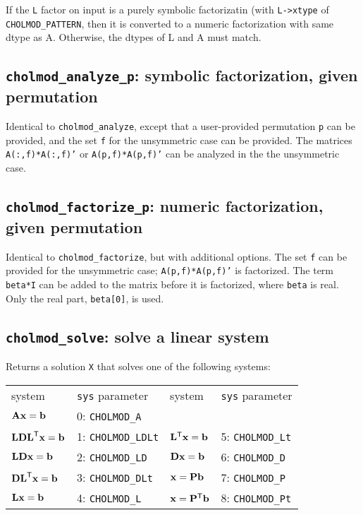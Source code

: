 \documentclass[11pt]{article}
\newcommand{\m}[1]{{\bf{#1}}}       %
\newcommand{\tr}{^{\sf T}}          %
\begin{document}
If the \verb'L' factor on input is a purely symbolic factorizatin (with
\verb'L->xtype' of \verb'CHOLMOD_PATTERN', then it is converted to a numeric
factorization with same dtype as A.  Otherwise, the dtypes of L and A must
match.

\subsection{{\tt cholmod\_analyze\_p}: symbolic factorization, given
permutation}


Identical to {\tt cholmod\_analyze}, except that a user-provided permutation
{\tt p} can be provided, and the set {\tt f} for the unsymmetric case can be
provided.  The matrices {\tt A(:,f)*A(:,f)'} or {\tt A(p,f)*A(p,f)'} can be
analyzed in the the unsymmetric case.

\subsection{{\tt cholmod\_factorize\_p}: numeric factorization, given
permutation}


Identical to {\tt cholmod\_factorize}, but with additional options.  The set
{\tt f} can be provided for the unsymmetric case; {\tt A(p,f)*A(p,f)'} is
factorized.  The term {\tt beta*I} can be added to the matrix before it is
factorized, where {\tt beta} is real.  Only the real part, {\tt beta[0]}, is
used.

\subsection{{\tt cholmod\_solve}: solve a linear system}


Returns a solution {\tt X} that solves one of the following systems:

\begin{tabular}{ll|ll}
\hline
system                  & {\tt sys} parameter    & system                & {\tt sys} parameter  \\
$\m{Ax}=\m{b}$          & 0: {\tt CHOLMOD\_A}    &                       &                      \\
$\m{LDL}\tr\m{x}=\m{b}$ & 1: {\tt CHOLMOD\_LDLt} & $\m{L}\tr\m{x}=\m{b}$ & 5: {\tt CHOLMOD\_Lt} \\
$\m{LDx}=\m{b}$         & 2: {\tt CHOLMOD\_LD}   & $\m{Dx}=\m{b}$        & 6: {\tt CHOLMOD\_D}  \\
$\m{DL}\tr\m{x}=\m{b}$  & 3: {\tt CHOLMOD\_DLt}  & $\m{x}=\m{Pb}$        & 7: {\tt CHOLMOD\_P}  \\
$\m{Lx}=\m{b}$          & 4: {\tt CHOLMOD\_L}    & $\m{x}=\m{P}\tr\m{b}$ & 8: {\tt CHOLMOD\_Pt} \\
\hline
\end{tabular}
\end{document}
